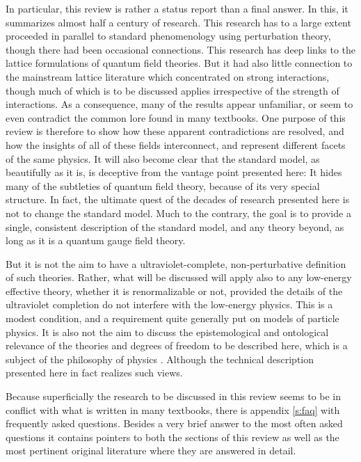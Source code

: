 \documentclass[final,12pt]{article}
\newcommand*{\1}{1\!\!\!\bot}
\begin{document}
In particular, this review is rather a status report than a final answer. In this, it summarizes almost half a century of research. This research has to a large extent proceeded in parallel to standard phenomenology using perturbation theory, though there had been occasional connections. This research has deep links to the lattice formulations of quantum field theories. But it had also little connection to the mainstream lattice literature which concentrated on strong interactions, though much of which is to be discussed applies irrespective of the strength of interactions. As a consequence, many of the results appear unfamiliar, or seem to even contradict the common lore found in many textbooks. One purpose of this review is therefore to show how these apparent contradictions are resolved, and how the insights of all of these fields interconnect, and represent different facets of the same physics. It will also become clear that the standard model, as beautifully as it is, is deceptive from the vantage point presented here: It hides many of the subtleties of quantum field theory, because of its very special structure. In fact, the ultimate quest of the decades of research presented here is not to change the standard model. Much to the contrary, the goal is to provide a single, consistent description of the standard model, and any theory beyond, as long as it is a quantum gauge field theory. 

But it is not the aim to have a ultraviolet-complete, non-perturbative definition of such theories. Rather, what will be discussed will apply also to any low-energy effective theory, whether it is renormalizable or not, provided the details of the ultraviolet completion do not interfere with the low-energy physics. This is a modest condition, and a requirement quite generally put on models of particle physics. It is also not the aim to discuss the epistemological and ontological relevance of the theories and degrees of freedom  to be described here, which is a subject of the philosophy of physics \cite{Lyre:2008af,Francois:2017aa}. Although the technical description presented here in fact realizes such views.

Because superficially the research to be discussed in this review seems to be in conflict with what is written in many textbooks, there is appendix \ref{s:faq} with frequently asked questions. Besides a very brief answer to the most often asked questions it contains pointers to both the sections of this review as well as the most pertinent original literature where they are answered in detail.
\end{document}
